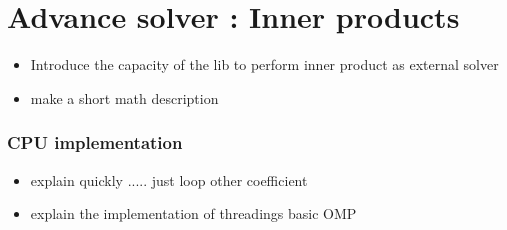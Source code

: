 \documentclass[oribibl]{llncs2e/llncs}
\begin{document}
\section{Advance solver : Inner products}

\begin{itemize}
\item Introduce the capacity of the lib to perform inner product  as external solver
\item make a short math description 
\end{itemize}


\subsubsection{CPU implementation}
\begin{itemize}
\item   explain quickly ..... just loop other coefficient 
\item  explain the implementation of threadings basic OMP
\end{itemize}
\end{document}
